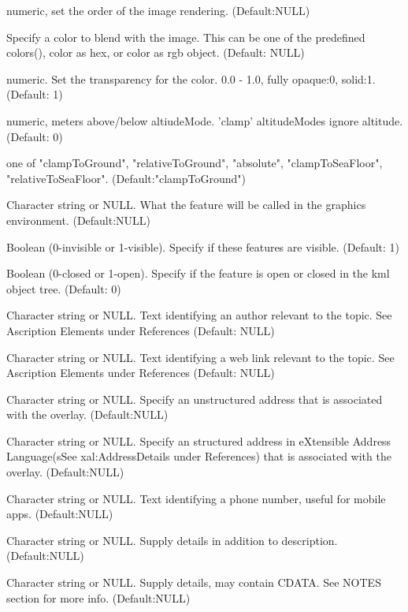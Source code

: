 \documentclass[a4paper]{book}
\begin{document}
\begin{Arguments}
\begin{ldescription}
\item[\code{drawOrder}]  numeric, set the order of the image rendering. (Default:NULL) 
\item[\code{color}] Specify a color to blend with the image. This can be one of the predefined colors(), color as hex, or color as rgb object. (Default: NULL)
\item[\code{transparency}] numeric. Set the transparency for the color. 0.0 - 1.0, fully opaque:0, solid:1. (Default: 1)
\item[\code{altitude}]  numeric, meters above/below altiudeMode. 'clamp' altitudeModes ignore altitude. (Default: 0)
\item[\code{altitudeMode}] one of "clampToGround", "relativeToGround", "absolute", "clampToSeaFloor", "relativeToSeaFloor". (Default:"clampToGround")
\item[\code{name}] Character string or NULL. What the feature will be called in the graphics environment. (Default:NULL) 
\item[\code{visibility}] Boolean (0-invisible or 1-visible). Specify if these features are visible. (Default: 1)
\item[\code{open}]  Boolean (0-closed or 1-open). Specify if the feature is open or closed in the kml object tree. (Default: 0)
\item[\code{atomauthor}]  Character string or NULL. Text identifying an author relevant to the topic. See Ascription Elements under References (Default: NULL) 
\item[\code{atomlinkhref}] Character string or NULL. Text identifying a web link relevant to the topic. See Ascription Elements under References (Default: NULL) 
\item[\code{address}] Character string or NULL. Specify an unstructured address that is associated with the overlay. (Default:NULL) 
\item[\code{xalAddressDetails}] Character string or NULL. Specify an structured address in eXtensible Address Language(sSee xal:AddressDetails under References) that is associated with the overlay. (Default:NULL) 
\item[\code{phoneNumber}]  Character string or NULL. Text identifying a phone number, useful for mobile apps. (Default:NULL) 
\item[\code{Snippet}] Character string or NULL. Supply details in addition to description. (Default:NULL)
\item[\code{description}] Character string or NULL. Supply details, may contain CDATA. See NOTES section for more info. (Default:NULL)

\end{ldescription}
\end{Arguments}
\end{document}
